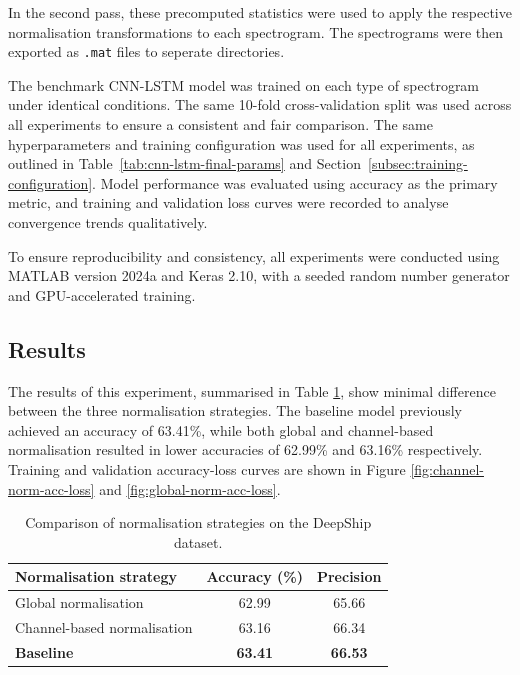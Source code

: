 In the second pass, these precomputed statistics were used to apply the respective normalisation transformations to each spectrogram. The spectrograms were then exported as \texttt{.mat} files to seperate directories.

The benchmark CNN-LSTM model was trained on each type of spectrogram under identical conditions. The same 10-fold cross-validation split was used across all experiments to ensure a consistent and fair comparison. The same hyperparameters and training configuration was used for all experiments, as outlined in Table~\ref{tab:cnn-lstm-final-params} and Section~\ref{subsec:training-configuration}. Model performance was evaluated using accuracy as the primary metric, and training and validation loss curves were recorded to analyse convergence trends qualitatively.

To ensure reproducibility and consistency, all experiments were conducted using MATLAB version 2024a and Keras 2.10, with a seeded random number generator and GPU-accelerated training.

\subsection{Results}

The results of this experiment, summarised in Table \ref{tab:normalisation-results}, show minimal difference between the three normalisation strategies. The baseline model previously achieved an accuracy of 63.41\%, while both global and channel-based normalisation resulted in lower accuracies of 62.99\% and 63.16\% respectively. Training and validation accuracy-loss curves are shown in Figure \ref{fig:channel-norm-acc-loss} and \ref{fig:global-norm-acc-loss}.

\begin{table}[h]
    \centering
    \caption{Comparison of normalisation strategies on the DeepShip dataset.}
    \label{tab:normalisation-results}
    \begin{tabular}{lcc}
        \toprule
        \textbf{Normalisation strategy} & \textbf{Accuracy (\%)} & \textbf{Precision} \\
        \midrule
        Global normalisation            & 62.99 & 65.66 \\
        Channel-based normalisation     & 63.16 & 66.34 \\
        \textbf{Baseline} & \textbf{63.41} & \textbf{66.53} \\
        \bottomrule
    \end{tabular}
\end{table}


